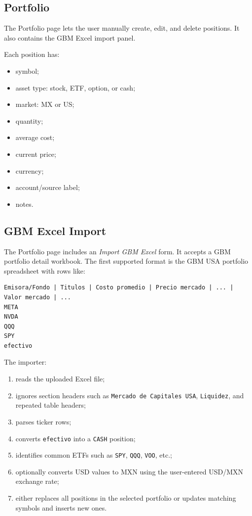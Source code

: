 \documentclass[11pt]{article}
\begin{document}
\subsection{Portfolio}

The Portfolio page lets the user manually create, edit, and delete positions. It also contains the GBM Excel import panel.

Each position has:

\begin{itemize}[noitemsep]
  \item symbol;
  \item asset type: stock, ETF, option, or cash;
  \item market: MX or US;
  \item quantity;
  \item average cost;
  \item current price;
  \item currency;
  \item account/source label;
  \item notes.
\end{itemize}

\subsection{GBM Excel Import}

The Portfolio page includes an \textit{Import GBM Excel} form. It accepts a GBM portfolio detail workbook. The first supported format is the GBM USA portfolio spreadsheet with rows like:

\begin{lstlisting}
Emisora/Fondo | Titulos | Costo promedio | Precio mercado | ... | Valor mercado | ...
META
NVDA
QQQ
SPY
efectivo
\end{lstlisting}

The importer:

\begin{enumerate}[noitemsep]
  \item reads the uploaded Excel file;
  \item ignores section headers such as \texttt{Mercado de Capitales USA}, \texttt{Liquidez}, and repeated table headers;
  \item parses ticker rows;
  \item converts \texttt{efectivo} into a \texttt{CASH} position;
  \item identifies common ETFs such as \texttt{SPY}, \texttt{QQQ}, \texttt{VOO}, etc.;
  \item optionally converts USD values to MXN using the user-entered USD/MXN exchange rate;
  \item either replaces all positions in the selected portfolio or updates matching symbols and inserts new ones.
\end{enumerate}
\end{document}
